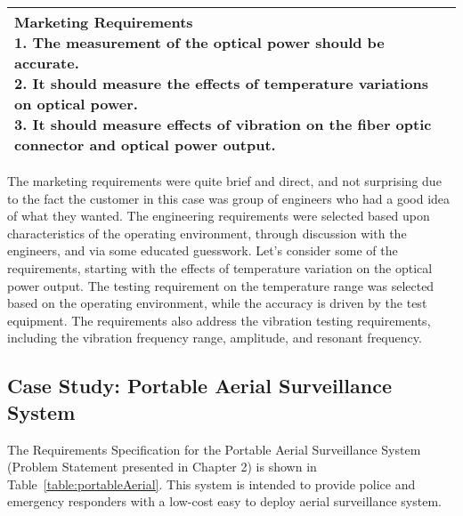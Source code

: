 \begin{longtable}{ |p{2.5cm}|p{5cm}|p{5cm}|}
\multicolumn{3}{|p{12cm}|}{
\textbf{Marketing Requirements} \newline
1.  The measurement of the optical power should be accurate.\newline
2.  It should measure the effects of temperature variations on optical power.\newline
3.  It should measure effects of vibration on the fiber optic connector
  and optical power output.}  \\ \hline
\end{longtable}

The marketing requirements were quite brief and direct, and not
surprising due to the fact the customer in this case was group of
engineers who had a good idea of what they wanted. The engineering
requirements were selected based upon characteristics of the operating
environment, through discussion with the engineers, and via some
educated guesswork. Let's consider some of the requirements, starting
with the effects of temperature variation on the optical power output.
The testing requirement on the temperature range was selected based on
the operating environment, while the accuracy is driven by the test
equipment. The requirements also address the vibration testing
requirements, including the vibration frequency range, amplitude, and
resonant frequency.

\subsection{Case Study: Portable Aerial Surveillance System}
\label{subsection:case-study-portable-aerial-surveillance-system}

The Requirements Specification for the Portable Aerial Surveillance
System (Problem Statement presented in Chapter 2) is shown in Table~\ref{table:portableAerial}.
This system is intended to provide police and emergency responders with
a low-cost easy to deploy aerial surveillance system.

